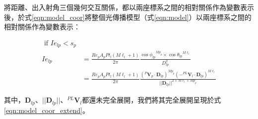             
                將距離、出入射角三個幾何交互關係，都以兩座標系之間的相對關係作為變數表示後，於式\ref{eqn:model_coor}將整個光傳播模型（式\ref{eqn:model}）以兩座標系之間的相對關係作為變數表示：
        
                \begin{equation}
                    \label{eqn:model_coor}
                    \begin{aligned}
                        \text { if } Ie_{lp}<s_p \\
                        Ie_{lp} &= \frac{Re_pA_pPt_l(M\ell_{l}+1)}{2 \pi} \frac{ {\cos\phi_{lp}}^{Mp_{p}} \times{\cos \theta_{lp}}^{M\ell_{l}}}{D^2_{lp}}\\
                            & = \frac{Re_pA_pPt_l(M\ell_{l}+1)}{2 \pi} \frac{ {{(^{P}\boldsymbol{V}_p \cdot {\boldsymbol{D}_{lp}})}}^{Mp_{p}} {(-^{PL}\boldsymbol{V}_l \cdot {\boldsymbol{D}_{lp}})}^{M\ell_{l}}}  {{||{\boldsymbol{D}_{lp}}||}^{2+M\ell_l+Mp_p}}
                    \end{aligned}
                \end{equation}
        
                \qquad
                其中，${\boldsymbol{D}_{lp}}$、$||{\boldsymbol{D}_{lp}}||$、$^{PL}\boldsymbol{V}_l$都還未完全展開，我們將其完全展開呈現於式\ref{eqn:model_coor_extend}。
        
